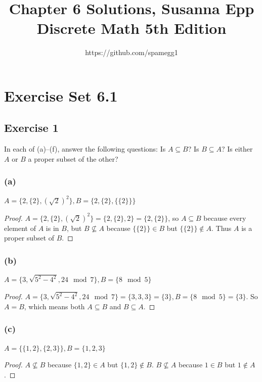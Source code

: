 \documentclass[14pt]{extarticle}
\title{Chapter 6 Solutions, Susanna Epp Discrete Math 5th Edition}
\author{https://github.com/spamegg1}
\begin{document}
\maketitle
\tableofcontents

\section{Exercise Set 6.1}

\subsection{Exercise 1}
In each of (a)–(f), answer the following questions: Is \(A \subseteq B\)? Is \(B \subseteq A\)? Is either $A$ or $B$ a 
proper subset of the other?

\subsubsection{(a)}
\(A = \{2, \{2\}, (\sqrt{2})^2\}, B = \{2, \{2\}, \{\{2\}\}\}\)

\begin{proof}
\(A = \{2, \{2\}, (\sqrt{2})^2\} = \{2, \{2\}, 2\} = \{2, \{2\}\}\), so \(A \subseteq B\) because every element of $A$
is in $B$, but \(B \nsubseteq A\) because \(\{\{2\}\} \in B\) but \(\{\{2\}\} \notin A\). Thus $A$ is a proper subset of $B$.
\end{proof}

\subsubsection{(b)}
\(A = \{3, \sqrt{5^2 - 4^2}, 24 \mod 7\}, B = \{8 \mod 5\}\)

\begin{proof}
\(A = \{3, \sqrt{5^2 - 4^2}, 24 \mod 7\} = \{3, 3, 3\} = \{3\}, B = \{8 \mod 5\} = \{3\}\). So $A = B$, which means
both \(A \subseteq B\) and \(B \subseteq A\).
\end{proof}

\subsubsection{(c)}
\(A = \{\{1, 2\}, \{2, 3\}\}, B = \{1, 2, 3\}\)

\begin{proof}
\(A \nsubseteq B\) because $\{1, 2\} \in A$ but $\{1, 2\} \notin B$.
\(B \nsubseteq A\) because $1 \in B$ but $1 \notin A$.
\end{proof}
\end{document}
